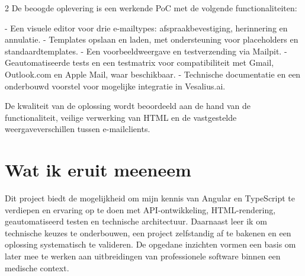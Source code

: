 \documentclass[a0,portrait]{hogent-poster}
\begin{document}
\begin{multicols}{2}
De beoogde oplevering is een werkende PoC met de volgende functionaliteiten:

- Een visuele editor voor drie e-mailtypes: afspraakbevestiging,
  herinnering en annulatie.
- Templates opslaan en laden, met ondersteuning voor placeholders en
  standaardtemplates.
- Een voorbeeldweergave en testverzending via Mailpit.
- Geautomatiseerde tests en een testmatrix voor compatibiliteit met
  Gmail, Outlook.com en Apple Mail, waar beschikbaar.
- Technische documentatie en een onderbouwd voorstel voor mogelijke
  integratie in Vesalius.ai.

De kwaliteit van de oplossing wordt beoordeeld aan de hand van de
functionaliteit, veilige verwerking van HTML en de vastgestelde
weergaveverschillen tussen e-mailclients.

\section{Wat ik eruit meeneem}
Dit project biedt de mogelijkheid om mijn kennis van Angular en TypeScript
te verdiepen en ervaring op te doen met API-ontwikkeling, HTML-rendering,
geautomatiseerd testen en technische architectuur. Daarnaast leer ik om
technische keuzes te onderbouwen, een project zelfstandig af te bakenen
en een oplossing systematisch te valideren. De opgedane inzichten vormen
een basis om later mee te werken aan uitbreidingen van professionele
software binnen een medische context.
\end{multicols}
\end{document}
